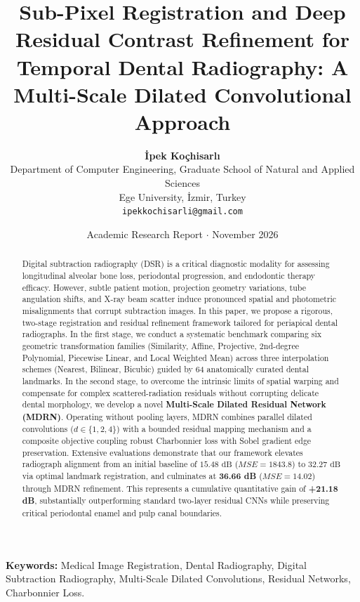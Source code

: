 \documentclass[11pt,a4paper]{article}
\title{
    \vspace{-1.0cm}
    \textbf{\Large Sub-Pixel Registration and Deep Residual Contrast Refinement for Temporal Dental Radiography: A Multi-Scale Dilated Convolutional Approach}
}
\author{
    \textbf{İpek Koçhisarlı} \\[0.2cm]
    \small Department of Computer Engineering, Graduate School of Natural and Applied Sciences \\
    \small Ege University, İzmir, Turkey \\
    \small \texttt{ipekkochisarli@gmail.com}
}
\date{\small Academic Research Report $\cdot$ November 2026}
\begin{document}
\maketitle
\thispagestyle{empty}

\begin{abstract}
\noindent Digital subtraction radiography (DSR) is a critical diagnostic modality for assessing longitudinal alveolar bone loss, periodontal progression, and endodontic therapy efficacy. However, subtle patient motion, projection geometry variations, tube angulation shifts, and X-ray beam scatter induce pronounced spatial and photometric misalignments that corrupt subtraction images. In this paper, we propose a rigorous, two-stage registration and residual refinement framework tailored for periapical dental radiographs. In the first stage, we conduct a systematic benchmark comparing six geometric transformation families (Similarity, Affine, Projective, 2nd-degree Polynomial, Piecewise Linear, and Local Weighted Mean) across three interpolation schemes (Nearest, Bilinear, Bicubic) guided by 64 anatomically curated dental landmarks. In the second stage, to overcome the intrinsic limits of spatial warping and compensate for complex scattered-radiation residuals without corrupting delicate dental morphology, we develop a novel \textbf{Multi-Scale Dilated Residual Network (MDRN)}. Operating without pooling layers, MDRN combines parallel dilated convolutions ($d \in \{1, 2, 4\}$) with a bounded residual mapping mechanism and a composite objective coupling robust Charbonnier loss with Sobel gradient edge preservation. Extensive evaluations demonstrate that our framework elevates radiograph alignment from an initial baseline of $15.48\text{ dB}$ ($MSE = 1843.8$) to $32.27\text{ dB}$ via optimal landmark registration, and culminates at \textbf{36.66 dB} ($MSE = 14.02$) through MDRN refinement. This represents a cumulative quantitative gain of \textbf{+21.18 dB}, substantially outperforming standard two-layer residual CNNs while preserving critical periodontal enamel and pulp canal boundaries.
\end{abstract}

\vspace{0.3cm}
\noindent\textbf{Keywords:} Medical Image Registration, Dental Radiography, Digital Subtraction Radiography, Multi-Scale Dilated Convolutions, Residual Networks, Charbonnier Loss.
\end{document}
